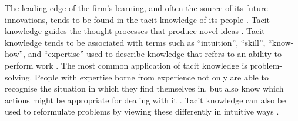 The leading edge of the firm’s learning, and often the source of its future innovations, tends to be found in the tacit knowledge of its people \citep{horvath2000working}. Tacit knowledge guides the thought processes that produce novel ideas \citep{leonard1998role,amar2008descriptive,seidler2008use}. Tacit knowledge tends to be associated with terms such as \enquote{intuition}, \enquote{skill}, \enquote{know-how}, and \enquote{expertise} used to describe knowledge that refers to an ability to perform work \citep{mcadam2007exploring}. The most common application of tacit knowledge is problem-solving. People with expertise borne from experience not only are able to recognise the situation in which they find themselves in, but also know which actions might be appropriate for dealing with it \citep{simon1971human,leonard1998role}. Tacit knowledge can also be used to reformulate problems by viewing these differently in intuitive ways \citep{leonard1998role}. \medskip

